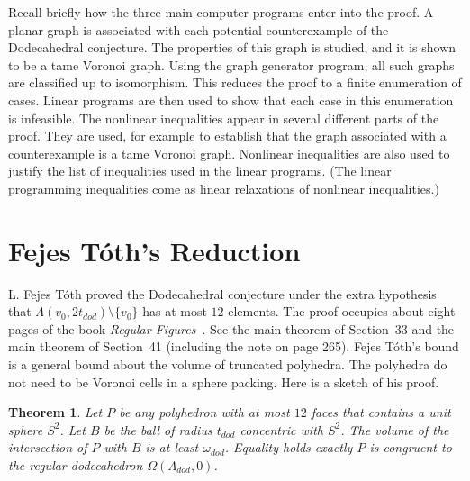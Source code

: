 \documentclass{article} %
\newtheorem{theorem}{Theorem}[section]
\begin{document}
Recall briefly how the three main computer programs enter into the
proof. A planar graph is associated with each potential counterexample
of the Dodecahedral conjecture. The properties of this graph is
studied, and it is shown to be a tame Voronoi graph. Using the graph
generator program, all such graphs are classified up to isomorphism.
This reduces the proof to a finite enumeration of cases. Linear
programs are then used to show that each case in this enumeration is
infeasible. The nonlinear inequalities appear in several different
parts of the proof. They are used, for example to establish that the
graph associated with a counterexample is a tame Voronoi graph.
Nonlinear inequalities are also used to justify the list of
inequalities used in the linear programs. (The linear programming
inequalities come as linear relaxations of nonlinear inequalities.)

\section{Fejes T\'oth's Reduction}\label{sec:12sphere}

L. Fejes T\'oth proved the Dodecahedral conjecture under the extra
hypothesis that $\Lambda(v_0,2t_{dod})\setminus\{v_0\}$ has at most
$12$ elements. The proof occupies about eight pages of the book
\emph{Regular Figures}~\cite{Toth:1964:Regular}. See the main theorem
of Section~33 and the main theorem of Section~41 (including the note
on page 265). Fejes T\'oth's bound is a general bound about the volume
of truncated polyhedra. The polyhedra do not need to be Voronoi cells
in a sphere packing. Here is a sketch of his proof.

\begin{theorem}
  Let $P$ be any polyhedron with at most $12$ faces that contains a
  unit sphere $S^2$. Let $B$ be the ball of radius $t_{dod}$ concentric
  with $S^2$. The volume of the intersection of $P$ with $B$ is at least
  $\omega_{dod}$. Equality holds
  exactly $P$ is congruent to the regular dodecahedron $\Omega(\Lambda_{dod},0)$.
\end{theorem}
\end{document}

